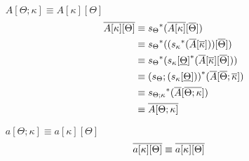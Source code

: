 \documentclass[10pt]{article}
\theoremstyle{definition}
\newcommand\St[2]{\ensuremath{{#1}^*(#2)}}
\begin{document}
\begin{enumerate}[style = multiline, labelwidth = 80pt]
\item[{$A[\Theta ; \kappa] \equiv A[\kappa][\Theta]$}] 
\begin{align*}
\upstairs{A[\kappa][\Theta]}
&\equiv \St{s_{\Theta}}{\upstairs{A[\kappa]}[\upstairs{\Theta}]} \\
&\equiv \St{s_{\Theta}}{(\St{s_{\kappa}}{\upstairs{A}[\upstairs{\kappa}]})[\upstairs{\Theta}]} \\
&\equiv \St{s_\Theta}{\St{s_\kappa[\downstairs{\Theta}]}{\upstairs{A}[ \upstairs{\kappa}][\upstairs{\Theta}]}} \\
&\equiv \St{(s_\Theta; (s_\kappa[\downstairs{\Theta}]))}{\upstairs{A}[\upstairs{\Theta} ; \upstairs{\kappa}]} \\
&\equiv \St{s_{\Theta ; \kappa}}{\upstairs{A}[\upstairs{\Theta ; \kappa}]} \\
&\equiv \upstairs{A[\Theta ; \kappa]}
\end{align*}

\item[{$a[\Theta ; \kappa] \equiv a[\kappa][\Theta]$}] 
\begin{align*}
\overline{a[\kappa][\Theta]}
&\equiv \overline{a[\kappa][\Theta]}
\end{align*}


\end{enumerate}
\end{document}
